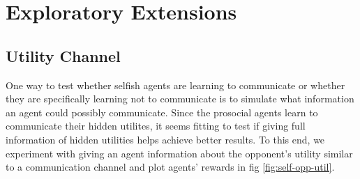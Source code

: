 \documentclass{article}
\begin{document}
\section{Exploratory Extensions}%
\label{sec:exploratory_experiments}

\subsection{Utility Channel}%
\label{sub:utility_channel}
One way to test whether selfish agents are learning to communicate or whether
they are specifically learning not to communicate is to simulate what
information an agent could possibly communicate. Since the prosocial agents
learn to communicate their hidden utilites, it seems fitting to test if giving
full information of hidden utilities helps achieve better
results. To this end, we experiment with giving an agent information about the
opponent's utility similar to a communication channel and plot agents' rewards
in fig \ref{fig:self-opp-util}.
\end{document}
